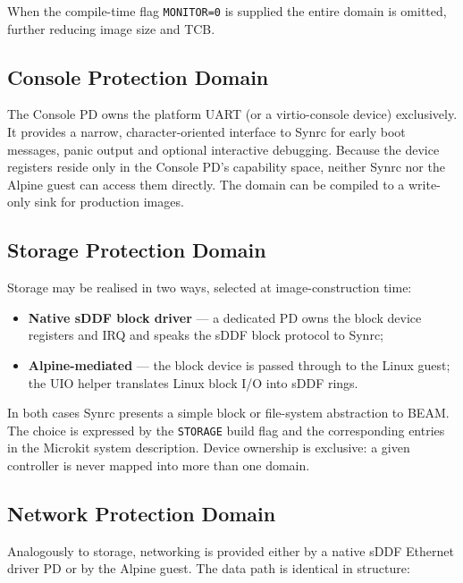 \documentclass{article}
\begin{document}
When the compile-time flag \texttt{MONITOR=0} is supplied the entire domain is omitted, further reducing image size and TCB.

\subsection{Console Protection Domain}
\label{sec:console}

The Console PD owns the platform UART (or a virtio-console device) exclusively.
It provides a narrow, character-oriented interface to Synrc for early boot messages,
panic output and optional interactive debugging.
Because the device registers reside only in the Console PD’s capability space,
neither Synrc nor the Alpine guest can access them directly.
The domain can be compiled to a write-only sink for production images.

\subsection{Storage Protection Domain}
\label{sec:storage}

Storage may be realised in two ways, selected at image-construction time:

\begin{itemize}
  \item \textbf{Native sDDF block driver} --- a dedicated PD owns the block device registers
        and IRQ and speaks the sDDF block protocol to Synrc;
  \item \textbf{Alpine-mediated} --- the block device is passed through to the Linux guest;
        the UIO helper translates Linux block I/O into sDDF rings.
\end{itemize}

In both cases Synrc presents a simple block or file-system abstraction to BEAM.
The choice is expressed by the \texttt{STORAGE} build flag and the corresponding
entries in the Microkit system description. Device ownership is exclusive:
a given controller is never mapped into more than one domain.

\subsection{Network Protection Domain}
\label{sec:network}

Analogously to storage, networking is provided either by a native sDDF Ethernet driver PD or by the Alpine guest.
The data path is identical in structure:
\end{document}
